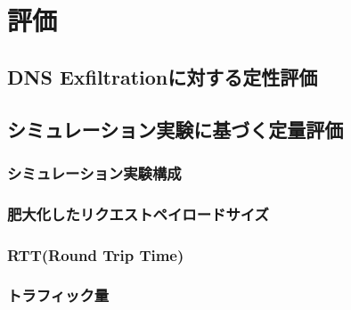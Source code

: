 \section{評価}
\subsection{DNS Exfiltrationに対する定性評価}
\subsection{シミュレーション実験に基づく定量評価}
\subsubsection{シミュレーション実験構成}
\subsubsection{肥大化したリクエストペイロードサイズ}
\subsubsection{RTT(Round Trip Time)}
\subsubsection{トラフィック量}
